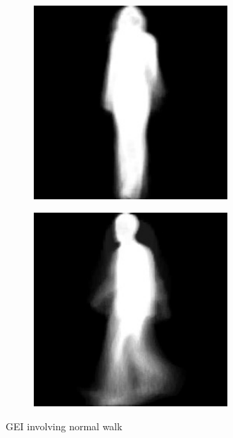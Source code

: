 \documentclass[12pt,a4paper]{article}
\begin{document}
\begin{figure}[!h]
    \centering
    \begin{subfigure}{0.45\textwidth}
        \centering
        \includegraphics[width=0.8\textwidth]{walk-nm1.jpg}
        
        \label{fig:img1}
    \end{subfigure}
    \begin{subfigure}{0.45\textwidth}
        \centering
        \includegraphics[width=0.8\textwidth]{walk-nm2.jpg}
        
        \label{fig:img2}
    \end{subfigure}
    \caption{GEI involving normal walk}
\end{figure}
\end{document}
